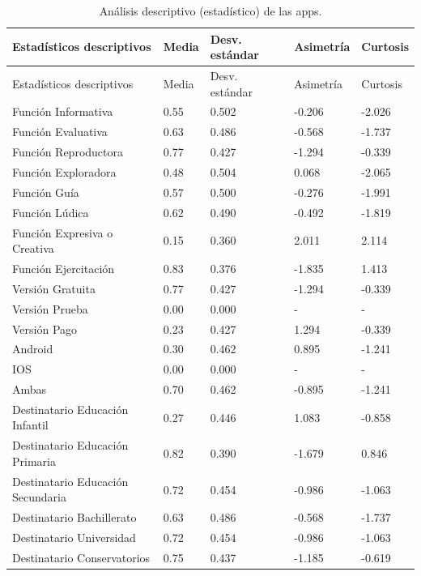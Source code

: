 \documentclass[spanish]{textolivre}
\begin{document}
\begin{longtable}{>{\raggedright\arraybackslash}p{7cm}%
                  llll
                  }
\caption{Análisis descriptivo (estadístico) de las apps.}\label{tab-7} \\
\toprule
Estadísticos descriptivos & Media & Desv. estándar & Asimetría & Curtosis \\
\midrule
\endfirsthead
\toprule
Estadísticos descriptivos & Media & Desv. estándar & Asimetría & Curtosis \\
\midrule
\endhead
Función Informativa & 0.55 & 0.502 & -0.206 & -2.026 \\
Función Evaluativa & 0.63 & 0.486 & -0.568 & -1.737 \\
Función Reproductora & 0.77 & 0.427 & -1.294 & -0.339 \\
Función Exploradora & 0.48 & 0.504 & 0.068 & -2.065 \\
Función Guía & 0.57 & 0.500 & -0.276 & -1.991 \\
Función Lúdica & 0.62 & 0.490 & -0.492 & -1.819 \\
Función Expresiva o Creativa & 0.15 & 0.360 & 2.011 & 2.114 \\
Función Ejercitación & 0.83 & 0.376 & -1.835 & 1.413 \\
Versión Gratuita & 0.77 & 0.427 & -1.294 & -0.339 \\
Versión Prueba & 0.00 & 0.000 & - & - \\
Versión Pago & 0.23 & 0.427 & 1.294 & -0.339 \\
Android & 0.30 & 0.462 & 0.895 & -1.241 \\
IOS & 0.00 & 0.000 & - & - \\
Ambas & 0.70 & 0.462 & -0.895 & -1.241 \\
Destinatario Educación Infantil & 0.27 & 0.446 & 1.083 & -0.858 \\
Destinatario Educación Primaria & 0.82 & 0.390 & -1.679 & 0.846 \\
Destinatario Educación Secundaria & 0.72 & 0.454 & -0.986 & -1.063 \\
Destinatario Bachillerato & 0.63 & 0.486 & -0.568 & -1.737 \\
Destinatario Universidad & 0.72 & 0.454 & -0.986 & -1.063 \\
Destinatario Conservatorios & 0.75 & 0.437 & -1.185 & -0.619 \\

\end{longtable}
\end{document}
